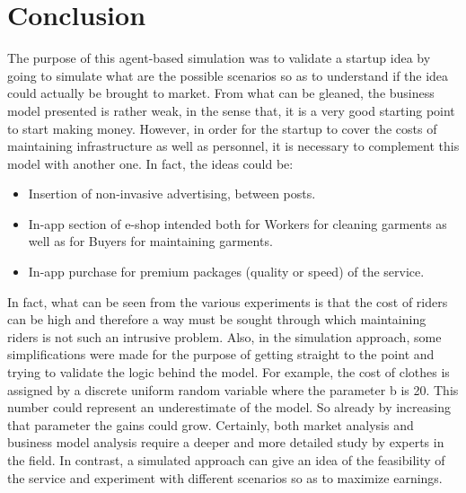 \chapter{Conclusion}\label{ch:conclusion}
The purpose of this agent-based simulation was to validate a startup idea by going to simulate what are the possible scenarios so as to understand if the idea could actually be brought to market. From what can be gleaned, the business model presented is rather weak, in the sense that, it is a very good starting point to start making money. However, in order for the startup to cover the costs of maintaining infrastructure as well as personnel, it is necessary to complement this model with another one. In fact, the ideas could be:
\begin{itemize}
 \item Insertion of non-invasive advertising, between posts.
 \item In-app section of e-shop intended both for Workers for cleaning garments as well as for Buyers for maintaining garments.
 \item In-app purchase for premium packages (quality or speed) of the service.
 \end{itemize} 
In fact, what can be seen from the various experiments is that the cost of riders can be high and therefore a way must be sought through which maintaining riders is not such an intrusive problem. 
 Also, in the simulation approach, some simplifications were made for the purpose of getting straight to the point and trying to validate the logic behind the model. For example, the cost of clothes is assigned by a discrete uniform random variable where the parameter b is 20. This number could represent an underestimate of the model. So already by increasing that parameter the gains could grow.
 Certainly, both market analysis and business model analysis require a deeper and more detailed study by experts in the field. 
 In contrast, a simulated approach can give an idea of the feasibility of the service and experiment with different scenarios so as to maximize earnings.